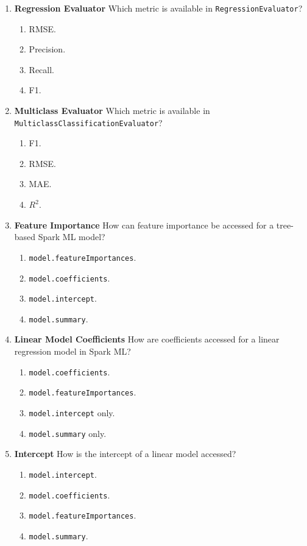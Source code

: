 \documentclass{article}
\begin{document}
\begin{enumerate}[label=\textbf{Q\arabic*.}]
		\item \textbf{Regression Evaluator}
		Which metric is available in \texttt{RegressionEvaluator}?
		\begin{enumerate}[label=\Alph*.]
			\item RMSE.
			\item Precision.
			\item Recall.
			\item F1.
		\end{enumerate}
		
		\item \textbf{Multiclass Evaluator}
		Which metric is available in \texttt{MulticlassClassificationEvaluator}?
		\begin{enumerate}[label=\Alph*.]
			\item F1.
			\item RMSE.
			\item MAE.
			\item $R^2$.
		\end{enumerate}
		
		\item \textbf{Feature Importance}
		How can feature importance be accessed for a tree-based Spark ML model?
		\begin{enumerate}[label=\Alph*.]
			\item \texttt{model.featureImportances}.
			\item \texttt{model.coefficients}.
			\item \texttt{model.intercept}.
			\item \texttt{model.summary}.
		\end{enumerate}
		
		\item \textbf{Linear Model Coefficients}
		How are coefficients accessed for a linear regression model in Spark ML?
		\begin{enumerate}[label=\Alph*.]
			\item \texttt{model.coefficients}.
			\item \texttt{model.featureImportances}.
			\item \texttt{model.intercept} only.
			\item \texttt{model.summary} only.
		\end{enumerate}
		
		\item \textbf{Intercept}
		How is the intercept of a linear model accessed?
		\begin{enumerate}[label=\Alph*.]
			\item \texttt{model.intercept}.
			\item \texttt{model.coefficients}.
			\item \texttt{model.featureImportances}.
			\item \texttt{model.summary}.
		\end{enumerate}
		

\end{enumerate}
\end{document}
